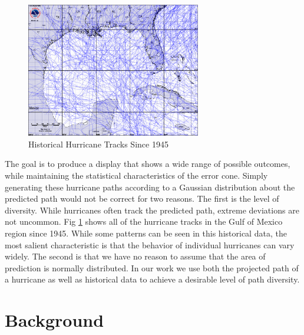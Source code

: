 \documentclass[journal]{vgtc}                %
\begin{document}
\begin{figure}
 \centering
 \includegraphics[width=3.0in]{figures/historical.eps}
 \caption{Historical Hurricane Tracks Since 1945}
 \label{fig:hist}
\end{figure}

The goal is to produce a display that shows a wide range of possible outcomes, while maintaining the statistical characteristics of the error cone.  Simply generating these hurricane paths according to a Gaussian distribution  about the predicted path would not be correct for two reasons.  The first is the level of diversity. 
While hurricanes often track the predicted path, extreme deviations are not uncommon.  
Fig \ref{fig:hist} shows all of the hurricane tracks in the Gulf of Mexico region since 1945.
While some patterns can be seen in this historical data, the most salient characteristic is that the behavior of individual hurricanes can vary widely.  
The second is that we have no reason to assume that the area of prediction is normally distributed.  In our work we use both the projected path of a hurricane as well as historical data to achieve a desirable level of path diversity.  



\section{Background}
\end{document}
